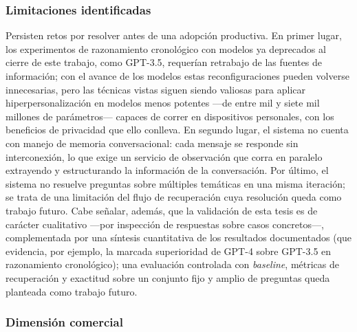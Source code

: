 \subsubsection{Limitaciones identificadas}

Persisten retos por resolver antes de una adopción productiva. En primer lugar, los experimentos de razonamiento cronológico con modelos ya deprecados al cierre de este trabajo, como GPT-3.5, requerían retrabajo de las fuentes de información; con el avance de los modelos estas reconfiguraciones pueden volverse innecesarias, pero las técnicas vistas siguen siendo valiosas para aplicar hiperpersonalización en modelos menos potentes —de entre mil y siete mil millones de parámetros— capaces de correr en dispositivos personales, con los beneficios de privacidad que ello conlleva. En segundo lugar, el sistema no cuenta con manejo de memoria conversacional: cada mensaje se responde sin interconexión, lo que exige un servicio de observación que corra en paralelo extrayendo y estructurando la información de la conversación. Por último, el sistema no resuelve preguntas sobre múltiples temáticas en una misma iteración; se trata de una limitación del flujo de recuperación cuya resolución queda como trabajo futuro. Cabe señalar, además, que la validación de esta tesis es de carácter cualitativo —por inspección de respuestas sobre casos concretos—, complementada por una síntesis cuantitativa de los resultados documentados (que evidencia, por ejemplo, la marcada superioridad de GPT-4 sobre GPT-3.5 en razonamiento cronológico); una evaluación controlada con \textit{baseline}, métricas de recuperación y exactitud sobre un conjunto fijo y amplio de preguntas queda planteada como trabajo futuro.

\subsubsection{Dimensión comercial}

